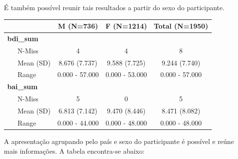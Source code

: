 \documentclass[
]{book}
\newenvironment{Shaded}{\begin{snugshade}}{\end{snugshade}}
\newcommand{\DataTypeTok}[1]{\textcolor[rgb]{0.13,0.29,0.53}{#1}}
\newcommand{\KeywordTok}[1]{\textcolor[rgb]{0.13,0.29,0.53}{\textbf{#1}}}
\newcommand{\NormalTok}[1]{#1}
\newcommand{\OperatorTok}[1]{\textcolor[rgb]{0.81,0.36,0.00}{\textbf{#1}}}
\newcommand{\OtherTok}[1]{\textcolor[rgb]{0.56,0.35,0.01}{#1}}
\newcommand{\StringTok}[1]{\textcolor[rgb]{0.31,0.60,0.02}{#1}}
\begin{document}
É também possível reunir tais resultados a partir do sexo do participante.

\begin{Shaded}
\end{Shaded}

\begin{longtable}[]{@{}lccc@{}}
\toprule
& M (N=736) & F (N=1214) & Total (N=1950)\tabularnewline
\midrule
\endhead
\textbf{bdi\_sum} & & &\tabularnewline
~~~N-Miss & 4 & 4 & 8\tabularnewline
~~~Mean (SD) & 8.676 (7.737) & 9.588 (7.725) & 9.244 (7.740)\tabularnewline
~~~Range & 0.000 - 57.000 & 0.000 - 53.000 & 0.000 - 57.000\tabularnewline
\textbf{bai\_sum} & & &\tabularnewline
~~~N-Miss & 5 & 0 & 5\tabularnewline
~~~Mean (SD) & 6.813 (7.142) & 9.470 (8.446) & 8.471 (8.082)\tabularnewline
~~~Range & 0.000 - 44.000 & 0.000 - 48.000 & 0.000 - 48.000\tabularnewline
\bottomrule
\end{longtable}

A apresentação agrupando pelo país e sexo do participante é possível e reúne mais informações. A tabela encontra-se abaixo:

\begin{Shaded}
\end{Shaded}
\end{document}
